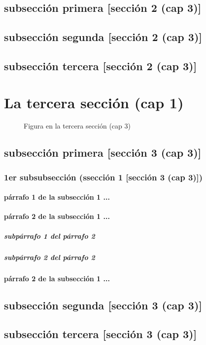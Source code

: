 \documentclass[12pt,a4paper]{report}
\begin{document}
\subsection{subsección primera [sección 2 (cap 3)]}
\subsection{subsección segunda [sección 2 (cap 3)]}
\subsection{subsección tercera [sección 2 (cap 3)]}
\section{La tercera sección (cap 1)}
\begin{figure}[H]
\caption{Figura en la tercera sección (cap 3)}
\end{figure}
\subsection{subsección primera [sección 3 (cap 3)]}
\subsubsection{1er subsubsección (ssección 1 [sección 3 (cap 3)])}
\paragraph{párrafo 1 de la subsección 1 ...}
\paragraph{párrafo 2 de la subsección 1 ...}
\subparagraph{subpárrafo 1 del párrafo 2}
\subparagraph{subpárrafo 2 del párrafo 2}
\paragraph{párrafo 2 de la subsección 1 ...}
\subsection{subsección segunda [sección 3 (cap 3)]}
\subsection{subsección tercera [sección 3 (cap 3)]}
\end{document}
